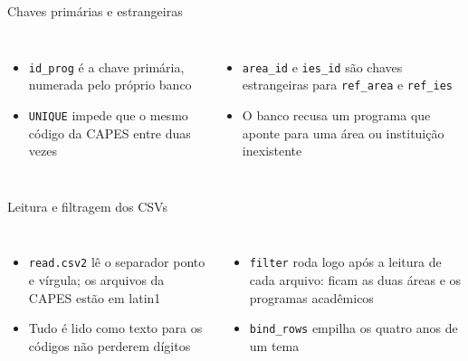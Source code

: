 \documentclass[aspectratio=169,10pt]{beamer}
\newcommand{\trecho}[2][codigo]{}
\newcommand{\cod}[1]{\texttt{#1}}
\begin{document}
\begin{frame}{Chaves primárias e estrangeiras}
  \trecho[codigomedio]{base_chaves.R}
  \vspace{0.6em}
  \begin{columns}[T]
    \begin{itemize}
      \item \cod{id\_prog} é a chave primária, numerada pelo próprio banco
      \item \cod{UNIQUE} impede que o mesmo código da CAPES entre duas vezes
    \end{itemize}
    \begin{itemize}
      \item \cod{area\_id} e \cod{ies\_id} são chaves estrangeiras para \cod{ref\_area} e \cod{ref\_ies}
      \item O banco recusa um programa que aponte para uma área ou instituição inexistente
    \end{itemize}
  \end{columns}
\end{frame}

\begin{frame}{Leitura e filtragem dos CSVs}
  \trecho[codigomaior]{base_leitura.R}
  \vspace{0.6em}
  \begin{columns}[T]
    \begin{itemize}
      \item \cod{read.csv2} lê o separador ponto e vírgula; os arquivos da CAPES estão em latin1
      \item Tudo é lido como texto para os códigos não perderem dígitos
    \end{itemize}
    \begin{itemize}
      \item \cod{filter} roda logo após a leitura de cada arquivo: ficam as duas áreas e os programas acadêmicos
      \item \cod{bind\_rows} empilha os quatro anos de um tema
    \end{itemize}
  \end{columns}
\end{frame}
\end{document}
